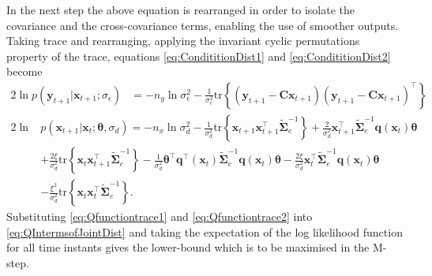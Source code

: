 \documentclass[]{article}
\begin{document}
In the next step the above equation is rearranged in order to isolate the covariance and the cross-covariance terms, enabling the use of smoother outputs. Taking trace and rearranging, applying the invariant cyclic permutations property of the trace, equations \eqref{eq:CondititionDist1} and \eqref{eq:CondititionDist2} become
\begin{align}\label{eq:Qfunctiontrace1}
  2\ln p\left(\mathbf y_{t+1}|\mathbf x_{t+1};\sigma_{\epsilon}\right) &= -n_y\ln \sigma_{\epsilon}^2-\frac{1}{\sigma_{\epsilon}^2}\mathrm{tr}\left\lbrace(\mathbf y_{t+1}-\mathbf C\mathbf  x_{t+1}) (\mathbf y_{t+1}-\mathbf C\mathbf  x_{t+1})^\top\right\rbrace    
\end{align}
\begin{align}
 2 \ln &p(\mathbf x_{t+1}|\mathbf x_{t};\boldsymbol \theta ,\sigma_d) =-n_x\ln\sigma_d^2-\frac{1}{\sigma_d^2}\mathrm{tr}\left\lbrace\mathbf x_{t+1} \mathbf x_{t+1}^\top\tilde{\boldsymbol\Sigma}_e^{-1}\right\rbrace+\frac{2}{\sigma_d^2}\mathbf x_{t+1}^\top\tilde{\boldsymbol\Sigma}_e^{-1}\mathbf q( \mathbf x_t)\boldsymbol\theta \nonumber \\
&+\frac{2\xi}{\sigma_d^2} \mathrm{tr} \left\lbrace \mathbf x_t\mathbf x_{t+1}^\top\tilde{\boldsymbol\Sigma}_e^{-1}\right\rbrace -\frac{1}{\sigma_d^2}\boldsymbol\theta^\top \mathbf q^\top(\mathbf x_t)\tilde{\boldsymbol\Sigma}_e^{-1}\mathbf q(\mathbf x_t)\boldsymbol\theta-\frac{2\xi}{\sigma_d^2} \mathbf x_t^\top\tilde{\boldsymbol\Sigma}_e^{-1}\mathbf q(\mathbf x_t)\boldsymbol\theta \nonumber \\
&-\frac{\xi^2}{\sigma_d^2}\mathrm{tr}\left\lbrace \mathbf x_t \mathbf x_t^\top\tilde{\boldsymbol\Sigma}_e^{-1}\right\rbrace. \label{eq:Qfunctiontrace2}
\end{align}
Substituting  \eqref{eq:Qfunctiontrace1} and \eqref{eq:Qfunctiontrace2} into \eqref{eq:QIntermsofJointDist} and taking the expectation of the log likelihood function for all time instants gives the lower-bound which is to be maximised in the M-step. 
\end{document}

